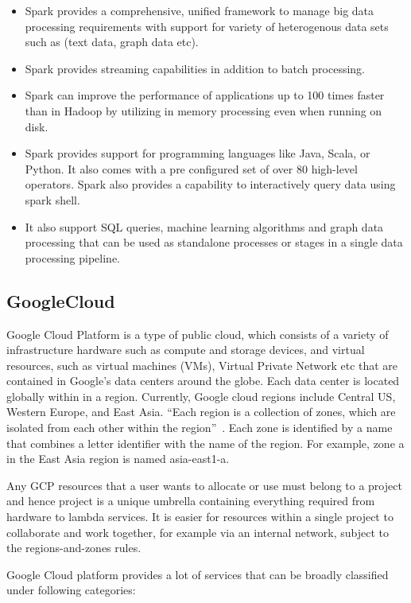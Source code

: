 \begin{itemize}
\item Spark provides a comprehensive, unified framework to manage big
  data processing requirements with support for variety of
  heterogenous data sets such as (text data, graph data etc).
\item Spark provides streaming capabilities in addition to batch
  processing.
\item Spark can improve the performance of applications up to 100
  times faster than in Hadoop by utilizing in memory processing even
  when running on disk.
\item Spark provides support for programming languages like Java,
  Scala, or Python. It also comes with a pre configured set of over 80
  high-level operators. Spark also provides a capability to
  interactively query data using spark shell.
\item It also support SQL queries, machine learning algorithms and
  graph data processing that can be used as standalone processes or
  stages in a single data processing pipeline.
\end{itemize}

\subsection{GoogleCloud}

Google Cloud Platform is a type of public cloud, which consists of a
variety of infrastructure hardware such as compute and storage
devices, and virtual resources, such as virtual machines (VMs),
Virtual Private Network etc that are contained in Google's data
centers around the globe. Each data center is located globally within
in a region. Currently, Google cloud regions include Central US,
Western Europe, and East Asia. ``Each region is a collection of zones,
which are isolated from each other within the
region''~\cite{hid-sp18-510-gcp}. Each zone is identified by a name
that combines a letter identifier with the name of the region. For
example, zone a in the East Asia region is named asia-east1-a.

Any GCP resources that a user wants to allocate or use must belong to
a project and hence project is a unique umbrella containing everything
required from hardware to lambda services. It is easier for resources
within a single project to collaborate and work together, for example
via an internal network, subject to the regions-and-zones rules.

Google Cloud platform provides a lot of services that can be broadly
classified under following categories:

